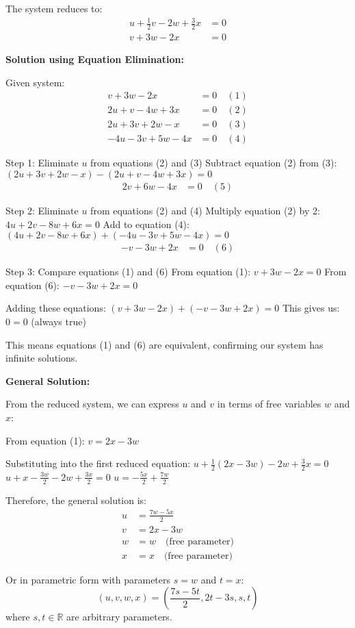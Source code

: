 The system reduces to:
\begin{align*}
u + \frac{1}{2}v - 2w + \frac{3}{2}x &= 0\\
v + 3w - 2x &= 0
\end{align*}

\textbf{Solution using Equation Elimination:}

Given system:
\begin{align}
v + 3w - 2x &= 0 \quad (1)\\
2u + v - 4w + 3x &= 0 \quad (2)\\
2u + 3v + 2w - x &= 0 \quad (3)\\
-4u - 3v + 5w - 4x &= 0 \quad (4)
\end{align}

Step 1: Eliminate $u$ from equations (2) and (3)
Subtract equation (2) from (3): $(2u + 3v + 2w - x) - (2u + v - 4w + 3x) = 0$
\begin{align}
2v + 6w - 4x &= 0 \quad (5)
\end{align}

Step 2: Eliminate $u$ from equations (2) and (4)
Multiply equation (2) by 2: $4u + 2v - 8w + 6x = 0$
Add to equation (4): $(4u + 2v - 8w + 6x) + (-4u - 3v + 5w - 4x) = 0$
\begin{align}
-v - 3w + 2x &= 0 \quad (6)
\end{align}

Step 3: Compare equations (1) and (6)
From equation (1): $v + 3w - 2x = 0$
From equation (6): $-v - 3w + 2x = 0$

Adding these equations: $(v + 3w - 2x) + (-v - 3w + 2x) = 0$
This gives us: $0 = 0$ (always true)

This means equations (1) and (6) are equivalent, confirming our system has infinite solutions.

\textbf{General Solution:}

From the reduced system, we can express $u$ and $v$ in terms of free variables $w$ and $x$:

From equation (1): $v = 2x - 3w$

Substituting into the first reduced equation:
$u + \frac{1}{2}(2x - 3w) - 2w + \frac{3}{2}x = 0$
$u + x - \frac{3w}{2} - 2w + \frac{3x}{2} = 0$
$u = -\frac{5x}{2} + \frac{7w}{2}$

Therefore, the general solution is:
\begin{align*}
u &= \frac{7w - 5x}{2}\\
v &= 2x - 3w\\
w &= w \quad \text{(free parameter)}\\
x &= x \quad \text{(free parameter)}
\end{align*}

Or in parametric form with parameters $s = w$ and $t = x$:
\[
\boxed{(u, v, w, x) = \left(\frac{7s - 5t}{2}, 2t - 3s, s, t\right)}
\]
where $s, t \in \mathbb{R}$ are arbitrary parameters.